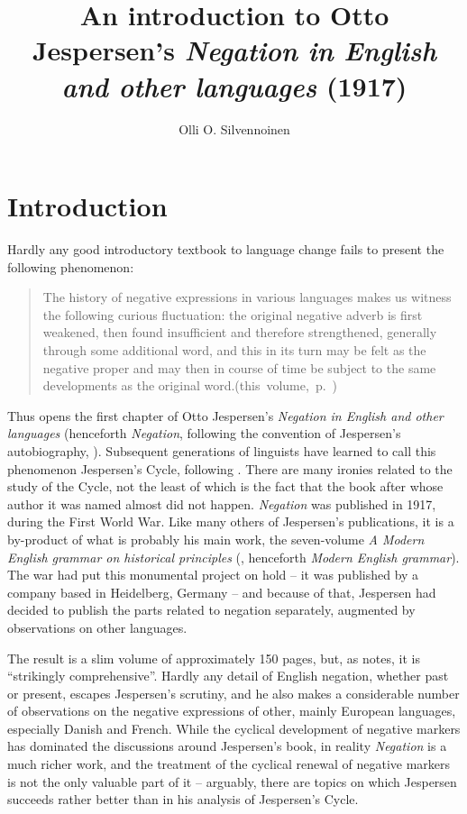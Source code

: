 \documentclass[output=chapter]{langscibook}
\title[Introduction]
      {An introduction to Otto Jespersen’s \textit{Negation in English and other languages} (1917)}
\author{Olli O. Silvennoinen\affiliation{Åbo Akademi University}}
\begin{document}
\maketitle
\label{ch:intro}
\section{Introduction}

Hardly any good introductory textbook to language change fails to present the following phenomenon:

\begin{quote}
    The history of negative expressions in various languages makes us witness the following curious fluctuation: the original negative adverb is first weakened, then found insufficient and therefore strengthened, generally through some additional word, and this in its turn may be felt as the negative proper and may then in course of time be subject to the same developments as the original word.\hfill\hbox{(this volume, p. \pageref{p:first})}
\end{quote}

Thus opens the first chapter of Otto Jespersen’s \textit{Negation in English and other languages} (henceforth \textit{Negation}, following the convention of Jespersen’s autobiography, \cite{Jespersen1995}). Subsequent generations of linguists have learned to call this phenomenon Jespersen's Cycle, following \citet{Dahl1979}. There are many ironies related to the study of the Cycle, not the least of which is the fact that the book after whose author it was named almost did not happen. \textit{Negation} was published in 1917, during %
the First World War. Like many others of Jespersen’s publications, it is a by-product of what is probably his main work, the seven\hyp volume \textit{A Modern English grammar on historical principles} (\cite{Jespersen1909}, henceforth \textit{Modern English grammar}). The war had put this monumental project on hold – it was published by a company based in Heidelberg, Germany – and because of that, Jespersen had decided to publish the parts related to negation separately, augmented by observations on other languages.

The result is a slim volume of approximately 150 pages, but, as \citet[30]{McCawley1995} notes, it is ``strikingly comprehensive''. Hardly any detail of English negation, whether past or present, escapes Jespersen’s scrutiny, and he also makes a considerable number of observations on the negative expressions of other, mainly European languages, especially Danish and French. While the cyclical development of negative markers has dominated the discussions around Jespersen’s book, in reality \textit{Negation} is a much richer work, and the treatment of the cyclical renewal of negative markers is not the only valuable part of it – arguably, there are topics on which Jespersen succeeds rather better than in his analysis of Jespersen's Cycle.
\end{document}

